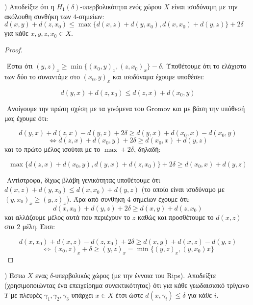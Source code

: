 \documentclass[oneside,a4paper]{article}
\newcommand {\tl}{\textlatin}
\begin{document}
\pagebreak


) Αποδείξτε ότι η $H_1(\delta)$-υπερβολικότητα ενός χώρου $X$ είναι ισοδύναμη με την ακόλουθη συνθήκη των $4$-σημείων: $d(x,y) + d(z,x_0) \leq \max \{d(x,z) + d(y,x_0), d(x,x_0) + d(y,z)\} + 2\delta$ για κάθε $x,y,z,x_0 \in X$.

\begin{proof} $ $

    $ $\newline
    Έστω ότι $(y,z)_x \geq \min \{ (x_0,y)_x, (z,x_0)_x\} - \delta$. Υποθέτουμε ότι το ελάχιστο των δύο το συναντάμε στο $(x_0,y)_x$ και ισοδύναμα έχουμε υποθέσει:

    $$d(y,x) + d(z,x_0) \leq d(z,x) + d(x_0,y)$$

    $ $\newline
    Ανοίγουμε την πρώτη σχέση με τα γινόμενα του \tl{Gromov} και με βάση την υπόθεσή μας έχουμε ότι:

    $$ d(y,x) + d(z,x) - d(y,z) + 2\delta \geq d(y,x) + d(x_0,x) - d(x_0,y)$$
    $$\iff d(z,x) + d(x_0,y) + 2\delta \geq d(x_0,x) + d(y,z)$$ και το πρώτο μέλος ισούται με το $\max + 2\delta$, δηλαδή:

    $$\max \{d(z,x) + d(x_0,y), d(y,x) + d(z,x_0)\} + 2\delta \geq d(x_0,x) + d(y,z)$$

    $ $\newline
    Αντίστροφα, δίχως βλάβη γενικότητας υποθέτουμε ότι $d(x,z) + d(y,x_0) \leq d(x,x_0) + d(y,z)$ (το οποίο είναι ισοδύναμο με $(y,x_0)_x \geq (y,z)_x$). Άρα από συνθήκη 4-σημείων έχουμε ότι:
    $$d(x,x_0) + d(y,z) + 2\delta \geq d(x,y) + d(z,x_0)$$ και αλλάζουμε μέλος αυτά που περιέχουν το $z$ καθώς και προσθέτουμε το $d(x,z)$ στα 2 μέλη. Έτσι:

    $$d(x,x_0) + d(x,z) - d(z,x_0) + 2\delta \geq d(x,y) + d(x,z) - d(y,z)$$
    $$\iff (x_0,z)_x + \delta \geq (y,z)_x = \min \{(y,z)_x, (y,x_0)x \}$$
\end{proof}




\pagebreak

) Έστω $X$ ενας $\delta$-υπερβολικός χώρος (με την έννοια του \tl{Rips}). Αποδείξτε (χρησιμοποιώντας ένα επειχείρημα συνεκτικότητας) ότι για κάθε γεωδαισιακό τρίγωνο $T$ με πλευρές $\gamma_1, \gamma_2, \gamma_3$ υπάρχει $x\in X$ έτσι ώστε $d(x,\gamma_i) \leq \delta$ για κάθε $i$.
\end{document}
